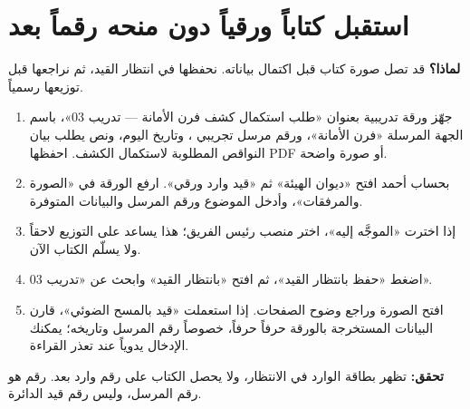 \section{استقبل كتاباً ورقياً دون منحه رقماً بعد}
\label{sec:paper}
\textbf{لماذا؟} قد تصل صورة كتاب قبل اكتمال بياناته. نحفظها في انتظار القيد، ثم نراجعها قبل توزيعها رسمياً.
\begin{enumerate}
\item جهّز ورقة تدريبية بعنوان «طلب استكمال كشف فرن الأمانة — تدريب 03»، باسم الجهة المرسلة «فرن الأمانة»، ورقم مرسل تجريبي ، وتاريخ اليوم، ونص يطلب بيان النواقص المطلوبة لاستكمال الكشف. احفظها PDF أو صورة واضحة.
\item بحساب أحمد افتح «ديوان الهيئة» ثم «قيد وارد ورقي». ارفع الورقة في «الصورة والمرفقات»، وأدخل الموضوع ورقم المرسل والبيانات المتوفرة.
\item إذا اخترت «الموجَّه إليه»، اختر منصب رئيس الفريق؛ هذا يساعد على التوزيع لاحقاً ولا يسلّم الكتاب الآن.
\item اضغط «حفظ بانتظار القيد»، ثم افتح «بانتظار القيد» وابحث عن «تدريب 03».
\item افتح الصورة وراجع وضوح الصفحات. إذا استعملت «قيد بالمسح الضوئي»، قارن البيانات المستخرجة بالورقة حرفاً حرفاً، خصوصاً رقم المرسل وتاريخه؛ يمكنك الإدخال يدوياً عند تعذر القراءة.
\end{enumerate}
\textbf{تحقق:} تظهر بطاقة الوارد في الانتظار، ولا يحصل الكتاب على رقم وارد بعد. رقم  هو رقم المرسل، وليس رقم قيد الدائرة.

